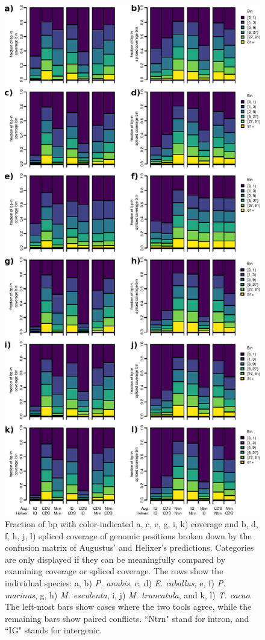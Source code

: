 \documentclass{article}
\renewcommand{\thefigure}{S\arabic{figure}}
\begin{document}
\begin{figure}[!h]
\label{supfig:each_sp_vs_augustus}
\centerline{\includegraphics[]{images/cov_examples/each_sp_vs_augustus}}
\caption{
Fraction of bp with color-indicated a, c, e, g, i, k) coverage and b, d, f, h, j, l) spliced coverage of genomic positions
broken down by the confusion matrix of Augustus' and Helixer's predictions. Categories
are only displayed if they can be meaningfully compared by examining coverage or spliced
coverage. The rows show the individual species: a, b) {\it P. anubis}, c, d) {\it E. caballus}, e, f) {\it P. marinus}, 
g, h) {\it M. esculenta}, i, j) {\it M. truncatula}, and k, l) {\it T. cacao}.
The left-most bars show cases where the two tools agree,
while the remaining bars show paired conflicts. ``Ntrn" stand
for intron, and ``IG" stands for intergenic.
}
\end{figure}
\end{document}
